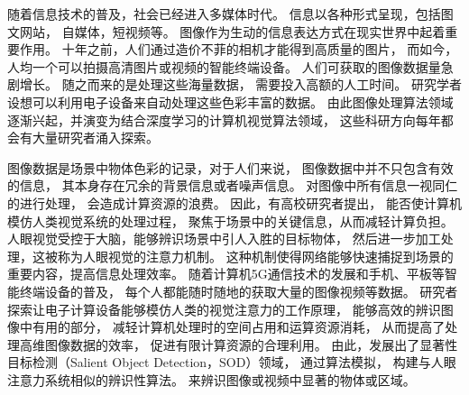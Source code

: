 



%
%
%
%
%
%
%
%
%
%
%





\label{chap:part1}


随着信息技术的普及，社会已经进入多媒体时代。
信息以各种形式呈现，包括图文网站，
自媒体，短视频等。
图像作为生动的信息表达方式在现实世界中起着重要作用。
十年之前，人们通过造价不菲的相机才能得到高质量的图片，
而如今，人均一个可以拍摄高清图片或视频的智能终端设备。
人们可获取的图像数据量急剧增长。
随之而来的是处理这些海量数据，
需要投入高额的人工时间。
研究学者设想可以利用电子设备来自动处理这些色彩丰富的数据。
由此图像处理算法领域逐渐兴起，并演变为结合深度学习的计算机视觉算法领域，
这些科研方向每年都会有大量研究者涌入探索。




图像数据是场景中物体色彩的记录，对于人们来说，
图像数据中并不只包含有效的信息，
其本身存在冗余的背景信息或者噪声信息。
对图像中所有信息一视同仁的进行处理，
会造成计算资源的浪费。
因此，有高校研究者提出，
能否使计算机模仿人类视觉系统的处理过程，
聚焦于场景中的关键信息，从而减轻计算负担。
人眼视觉受控于大脑，能够辨识场景中引人入胜的目标物体，
然后进一步加工处理，这被称为人眼视觉的注意力机制。
这种机制使得网络能够快速捕捉到场景的重要内容，提高信息处理效率。
随着计算机5G通信技术的发展和手机、平板等智能终端设备的普及，
每个人都能随时随地的获取大量的图像视频等数据。
研究者探索让电子计算设备能够模仿人类的视觉注意力的工作原理，
能够高效的辨识图像中有用的部分，
减轻计算机处理时的空间占用和运算资源消耗，
从而提高了处理高维图像数据的效率，
促进有限计算资源的合理利用。
由此，发展出了显著性目标检测（Salient Object Detection，SOD）领域，
通过算法模拟，
构建与人眼注意力系统相似的辨识性算法。
来辨识图像或视频中显著的物体或区域。




